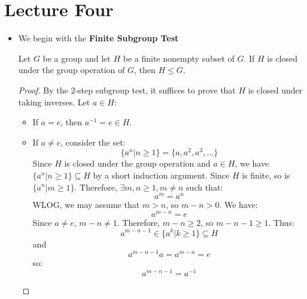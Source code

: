 \section{Lecture Four}
\begin{itemize}
    \item We begin with the \textbf{Finite Subgroup Test}
    \begin{theorem}
        Let $G$ be a group and let $H$ be a finite nonempty subset of $G$. If $H$ is closed under the group operation of $G$, then $H \le G$.
    \end{theorem}
    \begin{proof}
        By the $2$-step subgroup test, it suffices to prove that $H$ is closed under taking inverses. Let $a \in H$:
        \begin{itemize}
            \item If $a=e$, then $a^{-1}=e \in H$.
            \item If $a\neq e$, consider the set:
            \begin{equation}
                \{a^n | n \ge 1\} = \{a,a^2,a^3,\dots\}
            \end{equation}
            Since $H$ is closed under the group operation and $a \in H$, we have $\{a^n | n \ge 1 \} \subseteq H$ by a short induction argument. Since $H$ is finite, so is $\{a^n | m \ge 1\}$. Therefore, $\exists m,n \ge 1, m \neq n$ such that:
            \begin{equation}
                a^m = a^n
            \end{equation}
            WLOG, we may assume that $m > n$, so $m-n>0$. We have:
            \begin{equation}
                a^{m-n}=e
            \end{equation}
            Since $a\neq e$, $m-n\neq 1$. Therefore, $m-n \ge 2$, so $m-n-1 \ge 1$. Thus:
            \begin{equation}
                a^{m-n-1} \in \{a^k| k \ge 1\} \subseteq H
            \end{equation}
            and
            \begin{equation}
                a^{m-n-1}a = a^{m-n}=e
            \end{equation}
            so:
            \begin{equation}
                a^{m-n-1} = a^{-1}
            \end{equation}
        \end{itemize}
    \end{proof}

\end{itemize}
